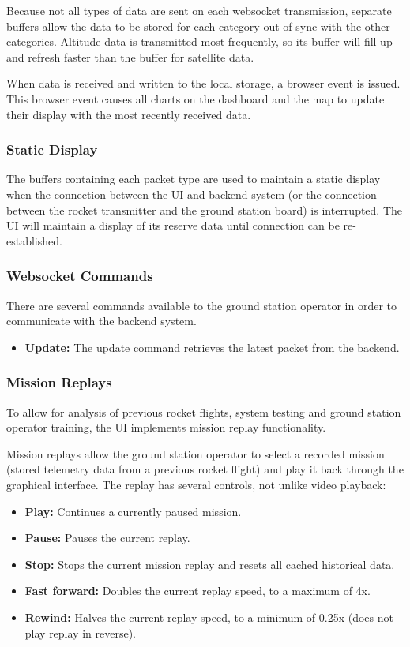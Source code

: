 Because not all types of data are sent on each websocket transmission, separate buffers allow the data to be stored for each
category out of sync with the other categories. Altitude data is transmitted most frequently, so its buffer will fill up and
refresh faster than the buffer for satellite data.

When data is received and written to the local storage, a browser event is issued. This browser event causes all charts on the
dashboard and the map to update their display with the most recently received data.

\subsubsection{Static Display}

The buffers containing each packet type are used to maintain a static display when the connection between the UI and backend
system (or the connection between the rocket transmitter and the ground station board) is interrupted. The UI will maintain
a display of its reserve data until connection can be re-established.

\subsubsection{Websocket Commands}

There are several commands available to the ground station operator in order to communicate with the backend system.

\begin{itemize}
    \item \textbf{Update:} The update command retrieves the latest packet from the backend.
\end{itemize}

\subsubsection{Mission Replays}

To allow for analysis of previous rocket flights, system testing and ground station operator training, the UI implements 
mission replay functionality.

Mission replays allow the ground station operator to select a recorded mission (stored telemetry data from a previous rocket
flight) and play it back through the graphical interface. The replay has several controls, not unlike video playback:

\begin{itemize}
    \item \textbf{Play:} Continues a currently paused mission.
    \item \textbf{Pause:} Pauses the current replay.
    \item \textbf{Stop:} Stops the current mission replay and resets all cached historical data.
    \item \textbf{Fast forward:} Doubles the current replay speed, to a maximum of 4x.
    \item \textbf{Rewind:} Halves the current replay speed, to a minimum of 0.25x (does not play replay in reverse).
\end{itemize}

